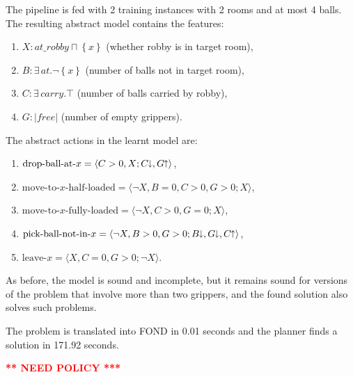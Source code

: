 \documentclass[letterpaper]{article} %
\newcommand{\tup}[1]{\langle #1 \rangle}
\newcommand{\set}[1]{\ensuremath{\left\{#1 \right\}}}
\newcommand{\abs}[1]{\ensuremath{\left\vert{#1}\right\vert}}
\newcommand{\abst}[2]{\tup{#1;#2}}
\newcommand{\pplus}{\hspace{-.05em}\raisebox{.15ex}{\footnotesize$\uparrow$}}
\newcommand{\mminus}{\hspace{-.05em}\raisebox{.15ex}{\footnotesize$\downarrow$}}
\begin{document}
The pipeline is fed with 2 training instances with 2 rooms and at most
4 balls. The resulting abstract model contains the features:
\begin{enumerate}[--]
  \item $X: at\_robby \sqcap \set{x}$ (whether robby is in target room),
  \item $B: \exists\,at . \neg \set{x}$ (number of balls not in target room),
  \item $C: \exists\,carry . \top$ (number of balls carried by robby),
  \item $G: \abs{free}$ (number of empty grippers).
\end{enumerate}
The abstract actions in the learnt model are:
\begin{enumerate}[--]
  \item $\text{drop-ball-at-$x$}=\abst{C>0, X}{C\mminus, G \pplus}$,
  \item $\text{move-to-$x$-half-loaded}\! =\!  \abst{\neg X, B=0, C>0, G\!>\!0}{X}$,
  \item $\text{move-to-$x$-fully-loaded} = \abst{\neg X, C>0, G=0}{X}$,
  \item $\text{pick-ball-not-in-$x$} = \abst{\neg X, B > 0, G > 0}{B\mminus, G\mminus, C\pplus}$,
  \item $\text{leave-$x$} = \abst{X, C=0, G > 0}{\neg X}$.
\end{enumerate}

As before, the model is sound and incomplete, but it remains sound
for versions of the problem that involve more than two grippers,
and the found solution also solves such problems.

The problem is translated into FOND in 0.01 seconds and the
planner finds a solution in 171.92 seconds.

\textcolor{red}{\bf *** NEED POLICY ***}
\end{document}
